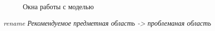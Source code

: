 \documentclass[a4paper,12pt]{extarticle}
\begin{document}
\begin{figure}[h]
\begin{minipage}[h]{0.3\linewidth}
    \end{minipage}
    \caption{Окна работы с моделью}
    \label{ris:panel}
\end{figure}



\renewcommand\refname{Литература}


\textit{rename Рекомендуемое}
\textit{предметная область -> проблеманая область}
\end{document}
